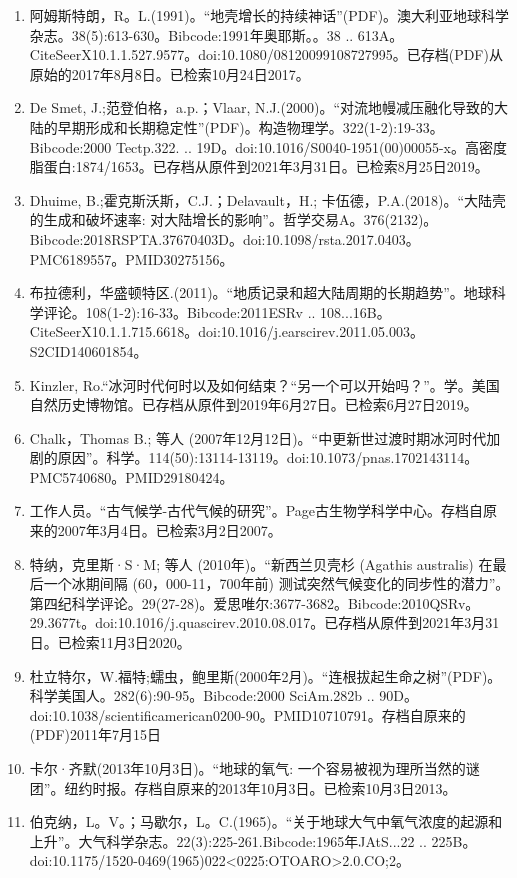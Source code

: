 \begin{enumerate}
\item 阿姆斯特朗，R。L.(1991)。“地壳增长的持续神话”(PDF)。澳大利亚地球科学杂志。38(5):613-630。Bibcode:1991年奥耶斯。。38 .. 613A。CiteSeerX10.1.1.527.9577。doi:10.1080/08120099108727995。已存档(PDF)从原始的2017年8月8日。已检索10月24日2017。  
\item De Smet, J.;范登伯格，a.p.；Vlaar, N.J.(2000)。“对流地幔减压融化导致的大陆的早期形成和长期稳定性”(PDF)。构造物理学。322(1-2):19-33。Bibcode:2000 Tectp.322. .. 19D。doi:10.1016/S0040-1951(00)00055-x。高密度脂蛋白:1874/1653。已存档从原件到2021年3月31日。已检索8月25日2019。
\item Dhuime, B.;霍克斯沃斯，C.J.；Delavault，H.; 卡伍德，P.A.(2018)。“大陆壳的生成和破坏速率: 对大陆增长的影响”。哲学交易A。376(2132)。Bibcode:2018RSPTA.37670403D。doi:10.1098/rsta.2017.0403。PMC6189557。PMID30275156。  
\item 布拉德利，华盛顿特区.(2011)。“地质记录和超大陆周期的长期趋势”。地球科学评论。108(1-2):16-33。Bibcode:2011ESRv .. 108...16B。CiteSeerX10.1.1.715.6618。doi:10.1016/j.earscirev.2011.05.003。S2CID140601854。  
\item Kinzler, Ro.“冰河时代何时以及如何结束？“另一个可以开始吗？”。学。美国自然历史博物馆。已存档从原件到2019年6月27日。已检索6月27日2019。
\item Chalk，Thomas B.; 等人 (2007年12月12日)。“中更新世过渡时期冰河时代加剧的原因”。科学。114(50):13114-13119。doi:10.1073/pnas.1702143114。PMC5740680。PMID29180424。  
\item 工作人员。“古气候学-古代气候的研究”。Page古生物学科学中心。存档自原来的2007年3月4日。已检索3月2日2007。
\item 特纳，克里斯·S·M; 等人 (2010年)。“新西兰贝壳杉 (Agathis australis) 在最后一个冰期间隔 (60，000-11，700年前) 测试突然气候变化的同步性的潜力”。第四纪科学评论。29(27-28)。爱思唯尔:3677-3682。Bibcode:2010QSRv。29.3677t。doi:10.1016/j.quascirev.2010.08.017。已存档从原件到2021年3月31日。已检索11月3日2020。
\item 杜立特尔，W.福特;蠕虫，鲍里斯(2000年2月)。“连根拔起生命之树”(PDF)。科学美国人。282(6):90-95。Bibcode:2000 SciAm.282b .. 90D。doi:10.1038/scientificamerican0200-90。PMID10710791。存档自原来的(PDF)2011年7月15日  
\item 卡尔·齐默(2013年10月3日)。“地球的氧气: 一个容易被视为理所当然的谜团”。纽约时报。存档自原来的2013年10月3日。已检索10月3日2013。
\item 伯克纳，L。V。；马歇尔，L。C.(1965)。“关于地球大气中氧气浓度的起源和上升”。大气科学杂志。22(3):225-261.Bibcode:1965年JAtS...22 .. 225B。doi:10.1175/1520-0469(1965)022<0225:OTOARO>2.0.CO;2。

\end{enumerate}
